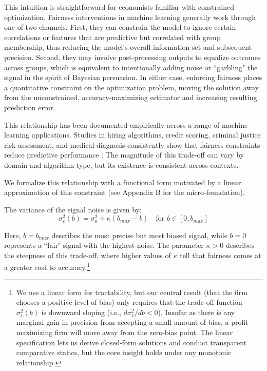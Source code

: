 This intuition is straightforward for economists familiar with constrained optimization. Fairness interventions in machine learning generally work through one of two channels. First, they can constrain the model to ignore certain correlations or features that are predictive but correlated with group membership, thus reducing the model's overall information set and subsequent precision. Second, they may involve post-processing outputs to equalize outcomes across groups, which is equivalent to intentionally adding noise or ``garbling" the signal in the spirit of Bayesian persuasion. In either case, enforcing fairness places a quantitative constraint on the optimization problem, moving the solution away from the unconstrained, accuracy-maximizing estimator and increasing resulting prediction error.

This relationship has been documented empirically across a range of machine learning applications. Studies in hiring algorithms, credit scoring, criminal justice risk assessment, and medical diagnosis consistently show that fairness constraints reduce predictive performance \citep{Kleinberg2017, Chouldechova2017}. The magnitude of this trade-off can vary by domain and algorithm type, but its existence is consistent across contexts.

We formalize this relationship with a functional form motivated by a linear approximation of this constraint (see Appendix B for the micro-foundation).

\begin{definition}
The variance of the signal noise is given by:
\begin{equation}
\sigma_\varepsilon^2(b) = \sigma_0^2 + \kappa(b_{max} - b) \quad \text{for } b \in [0, b_{max}]
\end{equation}
\end{definition}

Here, $b=b_{max}$ describes the most precise but most biased signal, while $b=0$ represents a ``fair" signal with the highest noise. The parameter $\kappa > 0$ describes the steepness of this trade-off, where higher values of $\kappa$ tell that fairness comes at a greater cost to accuracy.\footnote{We use a linear form for tractability, but our central result (that the firm chooses a positive level of bias) only requires that the trade-off function $\sigma_\varepsilon^2(b)$ is downward sloping (i.e., $d\sigma_\varepsilon^2/db < 0$). Insofar as there is any marginal gain in precision from accepting a small amount of bias, a profit-maximizing firm will move away from the zero-bias point. The linear specification lets us derive closed-form solutions and conduct transparent comparative statics, but the core insight holds under any monotonic relationship.}

